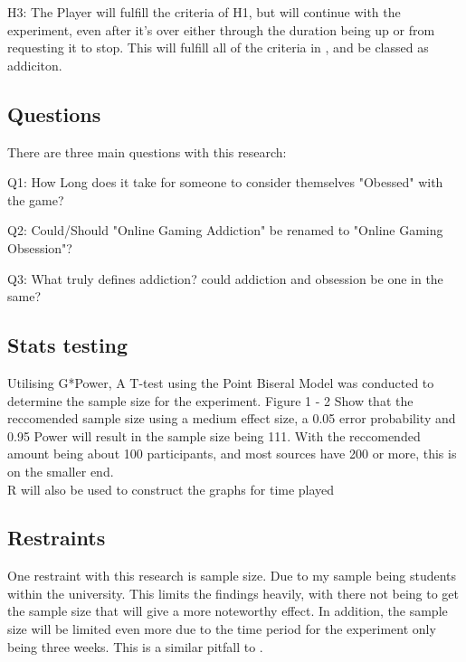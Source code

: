 \documentclass[conference]{IEEEtran}
\begin{document}
H3: The Player will fulfill the criteria of H1, but will continue with the experiment, even after it's over either through the duration being up or from requesting it to stop. This will fulfill all of the criteria in \cite{NHSHamp24}, and be classed as addiciton. \\
\subsection{Questions}
There are three main questions with this research:

Q1: How Long does it take for someone to consider themselves "Obessed" with the game?

Q2: Could/Should "Online Gaming Addiction" be renamed to "Online Gaming Obsession"?

Q3: What truly defines addiction? could addiction and obsession be one in the same?\\
\subsection {Stats testing}
Utilising G*Power, A T-test using the Point Biseral Model was conducted to determine the sample size for the experiment. Figure 1 - 2 Show that the reccomended sample size using a medium effect size, a 0.05 error probability and 0.95 Power will result in the sample size being 111.  With the reccomended amount being about 100 participants, and most sources have 200 or more, this is on the smaller end.\\

R will also be used to construct the graphs for time played

\subsection {Restraints}
One restraint with this research is sample size. Due to my sample being students within the university. This limits the findings heavily, with there not being to get the sample size that will give a more noteworthy effect. In addition, the sample size will be limited even more due to the time period for the experiment only being three weeks. This is a similar pitfall to \cite{Naaj2021}.\\


\end{document}
